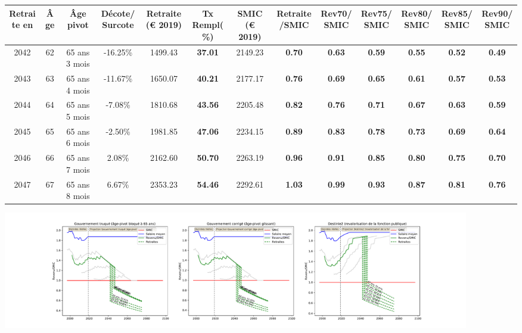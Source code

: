 { \scriptsize \begin{center} 
\begin{tabular}[htb]{|c|c||c|c||c|c||c||c|c|c|c|c|c|} 
\hline 
 Retraite en &  Âge &  Âge pivot &  Décote/Surcote &  Retraite (\euro{} 2019) &  Tx Rempl(\%) &  SMIC (\euro{} 2019) &  Retraite/SMIC &  Rev70/SMIC &  Rev75/SMIC &  Rev80/SMIC &  Rev85/SMIC &  Rev90/SMIC \\ 
\hline \hline 
 2042 &  62 &  65 ans 3 mois &  -16.25\% &  1499.43 &  {\bf 37.01} &  2149.23 &  {\bf {\color{red} 0.70}} &  {\bf {\color{red} 0.63}} &  {\bf {\color{red} 0.59}} &  {\bf {\color{red} 0.55}} &  {\bf {\color{red} 0.52}} &  {\bf {\color{red} 0.49}} \\ 
\hline 
 2043 &  63 &  65 ans 4 mois &  -11.67\% &  1650.07 &  {\bf 40.21} &  2177.17 &  {\bf {\color{red} 0.76}} &  {\bf {\color{red} 0.69}} &  {\bf {\color{red} 0.65}} &  {\bf {\color{red} 0.61}} &  {\bf {\color{red} 0.57}} &  {\bf {\color{red} 0.53}} \\ 
\hline 
 2044 &  64 &  65 ans 5 mois &  -7.08\% &  1810.68 &  {\bf 43.56} &  2205.48 &  {\bf {\color{red} 0.82}} &  {\bf {\color{red} 0.76}} &  {\bf {\color{red} 0.71}} &  {\bf {\color{red} 0.67}} &  {\bf {\color{red} 0.63}} &  {\bf {\color{red} 0.59}} \\ 
\hline 
 2045 &  65 &  65 ans 6 mois &  -2.50\% &  1981.85 &  {\bf 47.06} &  2234.15 &  {\bf {\color{red} 0.89}} &  {\bf {\color{red} 0.83}} &  {\bf {\color{red} 0.78}} &  {\bf {\color{red} 0.73}} &  {\bf {\color{red} 0.69}} &  {\bf {\color{red} 0.64}} \\ 
\hline 
 2046 &  66 &  65 ans 7 mois &  2.08\% &  2162.60 &  {\bf 50.70} &  2263.19 &  {\bf {\color{red} 0.96}} &  {\bf {\color{red} 0.91}} &  {\bf {\color{red} 0.85}} &  {\bf {\color{red} 0.80}} &  {\bf {\color{red} 0.75}} &  {\bf {\color{red} 0.70}} \\ 
\hline 
 2047 &  67 &  65 ans 8 mois &  6.67\% &  2353.23 &  {\bf 54.46} &  2292.61 &  {\bf 1.03} &  {\bf {\color{red} 0.99}} &  {\bf {\color{red} 0.93}} &  {\bf {\color{red} 0.87}} &  {\bf {\color{red} 0.81}} &  {\bf {\color{red} 0.76}} \\ 
\hline 
\hline 
\end{tabular} 
\end{center} } 

 \begin{center}\includegraphics[width=0.9\textwidth]{fig/TechHosp_1980_22_dest_retraite.pdf}\end{center} \label{fig/TechHosp_1980_22_dest_retraite.pdf} 

